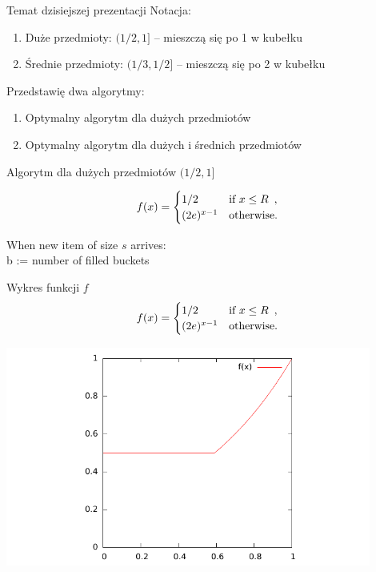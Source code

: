 \documentclass{beamer}
\newcommand{\ALG}{\textsc{Alg}}
\begin{document}
\begin{frame}{Temat dzisiejszej prezentacji}
  Notacja:
  \begin{enumerate}
    \item Duże przedmioty: $(1/2, 1]$ -- mieszczą się po 1 w kubełku
    \item Średnie przedmioty: $(1/3, 1/2]$ -- mieszczą się po 2 w kubełku
  \end{enumerate}

  \vspace{1cm}
  
  Przedstawię dwa algorytmy:
  
  \begin{enumerate}
    \item Optymalny algorytm dla dużych przedmiotów
    \item Optymalny algorytm dla dużych i średnich przedmiotów
  \end{enumerate}
\end{frame}

\begin{frame}{Algorytm dla dużych przedmiotów $(1/2, 1]$}

\[
f(x) =
\begin{cases}
  1/2 &\mbox{if } x \leq R \enspace, \\
  (2e)^{x-1} & \textnormal{otherwise.}
\end{cases}
\]


  
  \begin{algorithm}[H]
  When new item of size $s$ arrives:\\
  b := number of filled buckets \\
    
  \caption{$\ALG_L$}
\end{algorithm}
\end{frame}


\begin{frame}{Wykres funkcji $f$}
  \[
f(x) =
\begin{cases}
  1/2 &\mbox{if } x \leq R \enspace, \\
  (2e)^{x-1} & \textnormal{otherwise.}
\end{cases}
\]


  \includegraphics[width=0.9\textwidth]{figs/f.pdf}
\end{frame}
\end{document}

